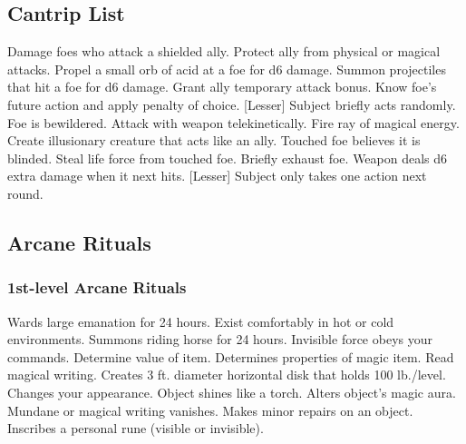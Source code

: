 \subsection{Cantrip List}\label{Cantrip List}
\begin{swspelllist}
     Damage foes who attack a shielded ally.
     Protect ally from physical or magical attacks.
     Propel a small orb of acid at a foe for d6 damage.
     Summon projectiles that hit a foe for d6 damage.
     Grant ally temporary attack bonus.
     Know foe's future action and apply penalty of choice.
    [Lesser] Subject briefly acts randomly.
     Foe is bewildered.
     Attack with weapon telekinetically.
     Fire ray of magical energy.
     Create illusionary creature that acts like an ally.
     Touched foe believes it is blinded.
     Steal life force from touched foe.
     Briefly exhaust foe.
     Weapon deals d6 extra damage when it next hits.
    [Lesser] Subject only takes one action next round.
\end{swspelllist}

\subsection{Arcane Rituals}\label{Arcane Rituals}
\subsubsection{1st-level Arcane Rituals}
\begin{rituallist}
     Wards large emanation for 24 hours.
     Exist comfortably in hot or cold environments.
     Summons riding horse for 24 hours.
     Invisible force obeys your commands.
     Determine value of item.
     Determines properties of magic item.
     Read magical writing.
     Creates 3 ft. diameter horizontal disk that holds 100 lb./level.
     Changes your appearance.
     Object shines like a torch.
     Alters object's magic aura.
     Mundane or magical writing vanishes.
     Makes minor repairs on an object.
     Inscribes a personal rune (visible or invisible).
\end{rituallist}

